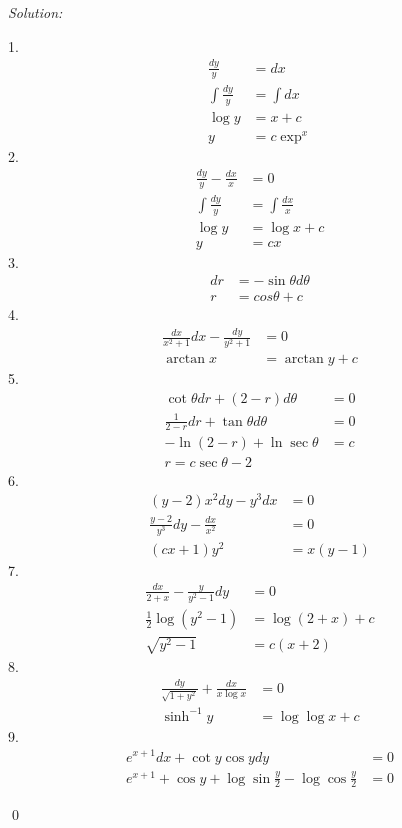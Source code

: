 \documentclass[12pt]{article}
\newenvironment{sol}
    {\emph{Solution:}
    }
    {
    \qed
    }
\begin{document}
\begin{sol}
1.  
\begin{align*}
	\frac{dy}{y} &= dx \\
	\int \frac{dy}{y} &= \int dx \\ 
	\log y &= x + c \\
	y &= c\exp^{x}
\end{align*}
2. 
\begin{align*}
	\frac{dy}{y} - \frac{dx}{x} &= 0\\
	\int \frac{dy}{y} &= \int \frac{dx}{x} \\
	\log y &= \log x + c \\
	y &= cx
\end{align*}
3. 
\begin{align*}
	dr &= -\sin\theta d\theta \\
	r &= cos\theta + c
\end{align*}
4. 
\begin{align*}
	\frac{dx}{x^2+1}dx - \frac{dy}{y^2+1} &= 0 \\
	\arctan x &= \arctan y + c
\end{align*}
5. 
\begin{align*}
	\cot\theta dr + (2-r)d\theta &= 0 \\
	\frac{1}{2-r}dr + \tan\theta d\theta &= 0 \\
	-\ln (2-r) + \ln\sec\theta &= c \\
	r = c\sec\theta - 2
\end{align*}
6. 
\begin{align*}
	(y-2)x^2dy - y^3 dx &= 0 \\
	\frac{y-2}{y^3}dy - \frac{dx}{x^2} &= 0 \\
	(cx+1)y^2 &= x(y-1)
\end{align*}
7. 
\begin{align*}
	\frac{dx}{2+x} - \frac{y}{y^2-1}dy &= 0 \\
	\frac{1}{2}\log(y^2 -1)  &= \log (2+x) + c \\
	\sqrt{y^2-1} &= c(x+2)
\end{align*}
8.
\begin{align*}
	\frac{dy}{\sqrt{1+y^2}} + \frac{dx}{x\log x} &= 0 \\
	\sinh^{-1}y &= \log\log x + c
\end{align*}
9. 
\begin{align*}
	e^{x+1}dx + \cot y \cos y dy &= 0 \\
	e^{x+1} + \cos y +\log\sin\frac{y}{2} - \log\cos\frac{y}{2} &= 0
\end{align*}

\end{sol}
\end{document}
